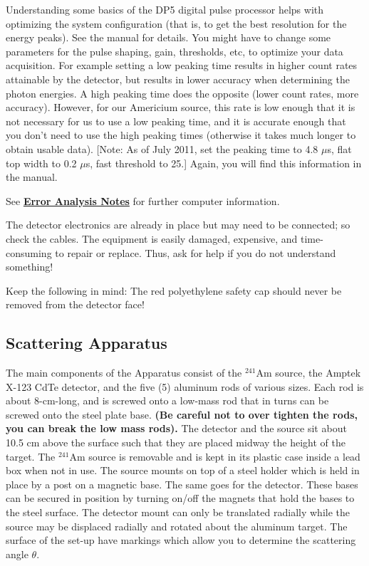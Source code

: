 \documentclass{../lab}
\begin{document}
Understanding some basics of the DP5 digital pulse processor helps with optimizing the system configuration (that is, to get the best resolution for the energy peaks). See the manual for details. You might have to change some parameters for the pulse shaping, gain, thresholds, etc, to optimize your data acquisition. For example setting a low peaking time results in higher count rates attainable by the detector, but results in lower accuracy when determining the photon energies. A high peaking time does the opposite (lower count rates, more accuracy). However, for our Americium source, this rate is low enough that it is not necessary for us to use a low peaking time, and it is accurate enough that you don't need to use the high peaking times (otherwise it takes much longer to obtain usable data). [Note: As of July 2011, set the peaking time to 4.8 $\mu$s, flat top width to 0.2 $\mu$s, fast threshold to 25.] Again, you will find this information in the manual.

See \href{\ErrorAnalysisNotes}{\textbf{\textbf{Error Analysis Notes}}} for further computer information.

The detector electronics are already in place but may need to be connected; so check the cables. The equipment is easily damaged, expensive, and time-consuming to repair or replace. Thus, ask for help if you do not understand something!

Keep the following in mind: The red polyethylene safety cap should never be removed from the detector face!

\subsection{Scattering Apparatus}

The main components of the Apparatus consist of the $^{241}$Am source, the Amptek X-123 CdTe detector, and the five (5) aluminum rods of various sizes. Each rod is about 8-cm-long, and is screwed onto a low-mass rod that in turns can be screwed onto the steel plate base. \textbf{(Be careful not to over tighten the rods, you can break the low mass rods).} The detector and the source sit about 10.5 cm above the surface such that they are placed midway the height of the target. The $^{241}$Am source is removable and is kept in its plastic case inside a lead box when not in use. The source mounts on top of a steel holder which is held in place by a post on a magnetic base. The same goes for the detector. These bases can be secured in position by turning on/off the magnets that hold the bases to the steel surface. The detector mount can only be translated radially while the source may be displaced radially and rotated about the aluminum target. The surface of the set-up have markings which allow you to determine the scattering angle $\theta$.
\end{document}
